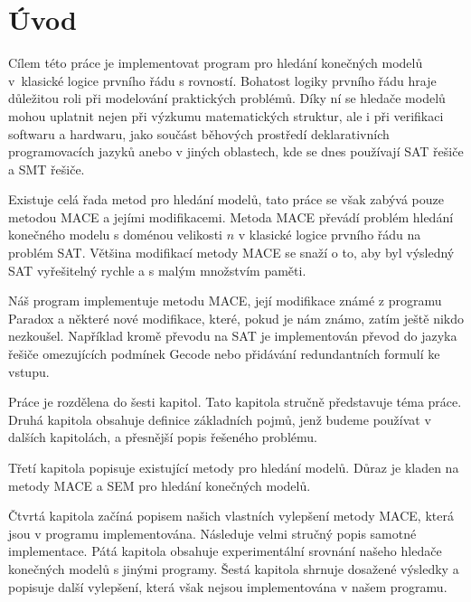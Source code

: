 \chapter{Úvod}

Cílem této práce je implementovat program pro hledání konečných
modelů v~klasické logice prvního řádu s rovností.
Bohatost logiky prvního řádu hraje důležitou roli při modelování
praktických problémů.
Díky ní se hledače modelů mohou uplatnit nejen při výzkumu
matematických struktur, ale i při verifikaci softwaru a hardwaru,
jako součást běhových prostředí deklarativních programovacích jazyků
anebo v jiných oblastech, kde se dnes používají SAT řešiče a SMT řešiče.

Existuje celá řada metod pro hledání modelů, tato práce se však
zabývá pouze metodou MACE a jejími modifikacemi.
Metoda MACE převádí problém hledání
konečného modelu s doménou velikosti $n$ v klasické logice prvního řádu
na problém SAT. Většina modifikací metody MACE se snaží o to, aby
byl výsledný SAT vyřešitelný rychle a s malým množstvím paměti.

Náš program implementuje metodu MACE, její modifikace známé
z programu Paradox a některé nové modifikace,
které, pokud je nám známo, zatím ještě nikdo nezkoušel.
Například kromě převodu na SAT je implementován
převod do jazyka řešiče omezujících podmínek Gecode
nebo přidávání redundantních formulí ke vstupu.

Práce je rozdělena do šesti kapitol. Tato kapitola
stručně představuje téma práce.
Druhá kapitola obsahuje definice základních pojmů,
jenž budeme používat v dalších kapitolách,
a přesnější popis řešeného problému.

Třetí kapitola popisuje existující metody pro hledání modelů.
Důraz je kladen na metody MACE a SEM pro hledání konečných modelů.

Čtvrtá kapitola začíná popisem našich vlastních vylepšení metody MACE,
která jsou v programu implementována.
Následuje velmi stručný popis samotné implementace.
Pátá kapitola obsahuje experimentální srovnání našeho hledače konečných modelů
s jinými programy.
Šestá kapitola shrnuje dosažené výsledky a popisuje další vylepšení,
která však nejsou implementována v našem programu.
